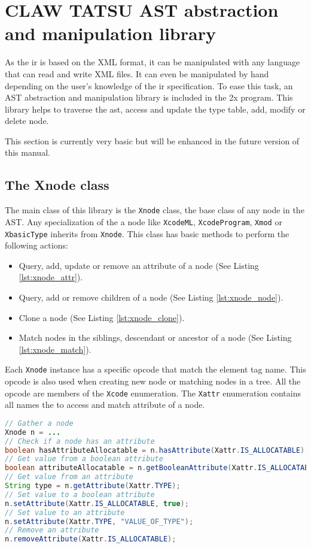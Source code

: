 \chapter{CLAW TATSU \xcodemlf AST abstraction and manipulation library}
\label{chapter:clawtatsu}
As the \xcodemlf \gls{ir} is based on the XML format, it can be manipulated with
any language that can read and write XML files. It can even be manipulated by
hand depending on the user's knowledge of the \xcodemlf \gls{ir} specification.
To ease this task, an AST abstraction and manipulation library is included 
in the \cx2x program. This library helps to traverse the \gls{ast}, access and
update the type table, add, modify or delete node.

This section is currently very basic but will be enhanced in the future version
of this manual.

\section{The Xnode class}
The main class of this library is the \lstinline|Xnode| class, the base class
of any node in the AST. 
Any specialization of the a node like \lstinline|XcodeML|, 
\lstinline|XcodeProgram|, \lstinline|Xmod| or \lstinline|XbasicType| inherits 
from \lstinline|Xnode|.
This class has basic methods to perform the following actions:
\begin{itemize}
\item Query, add, update or remove an attribute of a node 
      (See Listing \ref{lst:xnode_attr}).
\item Query, add or remove children of a node (See Listing \ref{lst:xnode_node}).
\item Clone a node (See Listing \ref{lst:xnode_clone}).
\item Match nodes in the siblings, descendant or ancestor of a node 
      (See Listing \ref{lst:xnode_match}).
\end{itemize}

Each \lstinline|Xnode| instance has a specific opcode that match the \xcodemlf 
element tag name.
This opcode is also used when creating new node or matching nodes in a tree.
All the opcode are members of the \lstinline|Xcode| enumeration.
The \lstinline|Xattr| enumeration contains all names the to access and match 
attribute of a node. 

\begin{lstlisting}[label=lst:xnode_attr, language=Java, caption=XtypeTable]
// Gather a node
Xnode n = ...
// Check if a node has an attribute
boolean hasAttributeAllocatable = n.hasAttribute(Xattr.IS_ALLOCATABLE);
// Get value from a boolean attribute
boolean attributeAllocatable = n.getBooleanAttribute(Xattr.IS_ALLOCATABLE);
// Get value from an attribute
String type = n.getAttribute(Xattr.TYPE);
// Set value to a boolean attribute
n.setAttribute(Xattr.IS_ALLOCATABLE, true);
// Set value to an attribute
n.setAttribute(Xattr.TYPE, "VALUE_OF_TYPE");
// Remove an attribute
n.removeAttribute(Xattr.IS_ALLOCATABLE);
\end{lstlisting}

